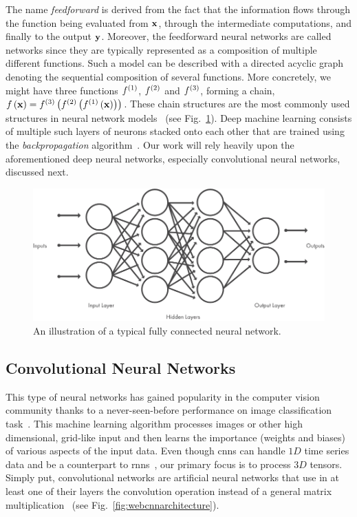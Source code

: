 The name \emph{feedforward} is derived from the fact that the information flows through the function being evaluated from ${\mathbf{x}}$, through the intermediate computations, and ﬁnally to the output ${\mathbf{y}}$. Moreover, the feedforward neural networks are called networks since they are typically represented as a composition of multiple different functions. Such a model can be described with a directed acyclic graph denoting the sequential composition of several functions. More concretely, we might have three functions ${f}^{\left( {1} \right)}$, ${f}^{\left( {2} \right)}$ and ${f}^{\left( {3} \right)}$, forming a chain, ${f} \left( {\mathbf{x}} \right) = {{f}^{\left( {3} \right)}} \left( {{f}^{\left( {2} \right)}} \left( {{f}^{\left( {1} \right)}} \left( {\mathbf{x}} \right) \right) \right)$. These chain structures are the most commonly used structures in neural network models~\cite{goodfellow2016dl} (see Fig.~\ref{fig:webfcarchitecture}). Deep machine learning consists of multiple such layers of neurons stacked onto each other that are trained using the \emph{backpropagation} algorithm~\cite{rumelhart1986backprop}. Our work will rely heavily upon the aforementioned deep neural networks, especially convolutional neural networks, discussed next.

\begin{figure}[t]
    \centerline{\includegraphics[width=0.8\linewidth]{figures/theoretical_foundations/typical_fcn_architecture.pdf}}
    \caption[A typical FC architecture]{An illustration of a typical fully connected neural network. }
    \label{fig:webfcarchitecture}
\end{figure}

\subsection{Convolutional Neural Networks}
\label{ssec:ConvolutionalNeuralNetworks}

This type of neural networks has gained popularity in the computer vision community thanks to a never-seen-before performance on image classification task~\cite{krizhevsky2012classification}. This machine learning algorithm processes images or other high dimensional, grid-like input and then learns the importance (weights and biases) of various aspects of the input data. Even though \glspl{cnn} can handle $1D$ time series data and be a counterpart to \glspl{rnn}~\cite{franoischollet2017learning}, our primary focus is to process $3D$ tensors. Simply put, convolutional networks are artificial neural networks that use in at least one of their layers the convolution operation instead of a general matrix multiplication~\cite{goodfellow2016dl} (see Fig.~\ref{fig:webcnnarchitecture}).

